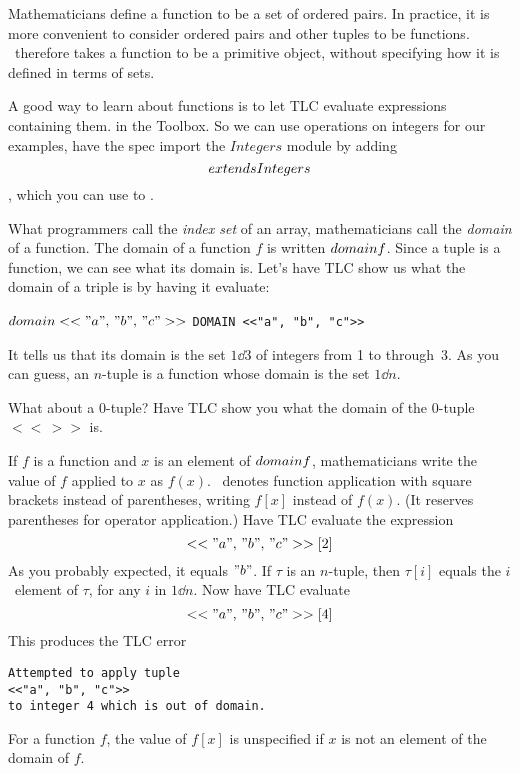 \documentclass[fleqn,leqno]{article}
\begin{document}
Mathematicians define a function to be a set of ordered pairs.  In
practice, it is more convenient to consider ordered pairs and other
tuples to be functions.
% 
% 
\tlaplus\ therefore takes a function to be a primitive object, without
specifying how it is defined in terms of sets.  

A good way to learn about functions is to let TLC evaluate expressions
containing them.   in the
Toolbox.  So we can use operations on integers for our examples,
have the spec import the $Integers$ module by adding 
 \[\EXTENDS Integers \]
, which you can use to
.


What programmers call the 
\emph{index set} of an array, mathematicians
call the 
\emph{domain} of a function.  The domain of a function $f$ is
written $\DOMAIN f$.  Since a 
tuple is a function, we can see what its
domain is.  Let's have TLC show us what the domain of a triple is by
having it evaluate:
\begin{twocols}
$\DOMAIN <<"a",\, "b",\, "c">>$
\midcol
\verb|DOMAIN <<"a", "b", "c">>|
\end{twocols}
It tells us that its domain is the set $1\dd3$ of integers from 1 to 
through~3.  As you can guess, an $n$-tuple is a function whose domain
is the set $1\dd n$.  

What about a 0-tuple?  Have TLC show you what the domain of the 0-tuple
$<<\,>>$ is.

If $f$ is a function and $x$ is an element of $\DOMAIN f$,
mathematicians write the value of $f$ applied to $x$ as $f(x)$.
\tlaplus\ denotes function application with square brackets instead of
parentheses, writing $f[x]$ instead of $f(x)$.  (It 
reserves parentheses for operator application.)
Have TLC evaluate the expression 
 \[ <<"a",\, "b",\, "c">>[2] \]
As you probably expected, it equals $"b"$.  If $\tau$ is an $n$-tuple,
then $\tau[i]$ equals the $i$\tth\ element of $\tau$, for any $i$ in
$1\dd n$.  Now have TLC evaluate
 \[ <<"a",\, "b",\, "c">>[4]\]
This produces the TLC error
\begin{display}
\begin{verbatim}
Attempted to apply tuple
<<"a", "b", "c">>
to integer 4 which is out of domain.
\end{verbatim}
\end{display}
For a function $f$, the value of $f[x]$ is unspecified if $x$ is
not an element of the domain of $f$.  
\end{document}
